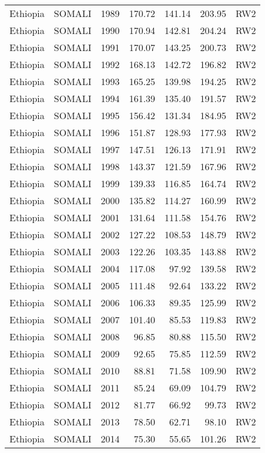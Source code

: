 \begin{longtable}{lllrrrl}
  Ethiopia & SOMALI & 1989 & 170.72 & 141.14 & 203.95 & RW2 \\ 
  Ethiopia & SOMALI & 1990 & 170.94 & 142.81 & 204.24 & RW2 \\ 
  Ethiopia & SOMALI & 1991 & 170.07 & 143.25 & 200.73 & RW2 \\ 
  Ethiopia & SOMALI & 1992 & 168.13 & 142.72 & 196.82 & RW2 \\ 
  Ethiopia & SOMALI & 1993 & 165.25 & 139.98 & 194.25 & RW2 \\ 
  Ethiopia & SOMALI & 1994 & 161.39 & 135.40 & 191.57 & RW2 \\ 
  Ethiopia & SOMALI & 1995 & 156.42 & 131.34 & 184.95 & RW2 \\ 
  Ethiopia & SOMALI & 1996 & 151.87 & 128.93 & 177.93 & RW2 \\ 
  Ethiopia & SOMALI & 1997 & 147.51 & 126.13 & 171.91 & RW2 \\ 
  Ethiopia & SOMALI & 1998 & 143.37 & 121.59 & 167.96 & RW2 \\ 
  Ethiopia & SOMALI & 1999 & 139.33 & 116.85 & 164.74 & RW2 \\ 
  Ethiopia & SOMALI & 2000 & 135.82 & 114.27 & 160.99 & RW2 \\ 
  Ethiopia & SOMALI & 2001 & 131.64 & 111.58 & 154.76 & RW2 \\ 
  Ethiopia & SOMALI & 2002 & 127.22 & 108.53 & 148.79 & RW2 \\ 
  Ethiopia & SOMALI & 2003 & 122.26 & 103.35 & 143.88 & RW2 \\ 
  Ethiopia & SOMALI & 2004 & 117.08 & 97.92 & 139.58 & RW2 \\ 
  Ethiopia & SOMALI & 2005 & 111.48 & 92.64 & 133.22 & RW2 \\ 
  Ethiopia & SOMALI & 2006 & 106.33 & 89.35 & 125.99 & RW2 \\ 
  Ethiopia & SOMALI & 2007 & 101.40 & 85.53 & 119.83 & RW2 \\ 
  Ethiopia & SOMALI & 2008 & 96.85 & 80.88 & 115.50 & RW2 \\ 
  Ethiopia & SOMALI & 2009 & 92.65 & 75.85 & 112.59 & RW2 \\ 
  Ethiopia & SOMALI & 2010 & 88.81 & 71.58 & 109.90 & RW2 \\ 
  Ethiopia & SOMALI & 2011 & 85.24 & 69.09 & 104.79 & RW2 \\ 
  Ethiopia & SOMALI & 2012 & 81.77 & 66.92 & 99.73 & RW2 \\ 
  Ethiopia & SOMALI & 2013 & 78.50 & 62.71 & 98.10 & RW2 \\ 
  Ethiopia & SOMALI & 2014 & 75.30 & 55.65 & 101.26 & RW2 \\ 

\end{longtable}
